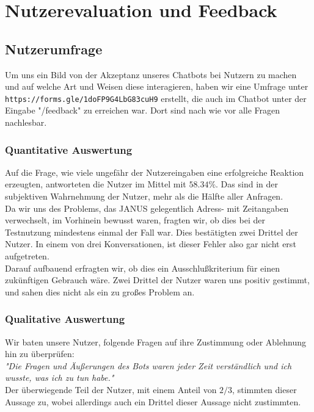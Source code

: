 \chapter{Nutzerevaluation und Feedback}
\section{Nutzerumfrage}
Um uns ein Bild von der Akzeptanz unseres Chatbots bei Nutzern zu machen und auf welche Art und Weisen diese interagieren, haben wir eine Umfrage unter\\\texttt{https://forms.gle/1doFP9G4LbG83cuH9} erstellt, die auch im Chatbot unter der Eingabe "/feedback" zu erreichen war. Dort sind nach wie vor alle Fragen nachlesbar.\\

\subsection{Quantitative Auswertung}
Auf die Frage, wie viele ungefähr der Nutzereingaben eine erfolgreiche Reaktion erzeugten, antworteten die Nutzer im Mittel mit $58.34\%$. Das sind in der subjektiven Wahrnehmung der Nutzer, mehr als die Hälfte aller Anfragen.\\

Da wir uns des Problems, das JANUS gelegentlich Adress- mit Zeitangaben verwechselt, im Vorhinein bewusst waren, fragten wir, ob dies bei der Testnutzung mindestens einmal der Fall war. Dies bestätigten zwei Drittel der Nutzer. In einem von drei Konversationen, ist dieser Fehler also gar nicht erst aufgetreten.\\
Darauf aufbauend erfragten wir, ob dies ein Ausschlußkriterium für einen zukünftigen Gebrauch wäre. Zwei Drittel der Nutzer waren uns positiv gestimmt, und sahen dies nicht als ein zu großes Problem an.

\subsection{Qualitative Auswertung}
Wir baten unsere Nutzer, folgende Fragen auf ihre Zustimmung oder Ablehnung hin zu überprüfen:\\

\textit{"Die Fragen und Äußerungen des Bots waren jeder Zeit verständlich und ich wusste, was ich zu tun habe."}\\
Der überwiegende Teil der Nutzer, mit einem Anteil von $2/3$, stimmten dieser Aussage zu, wobei allerdings auch ein Drittel dieser Aussage nicht zustimmten.\\

